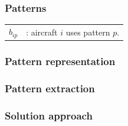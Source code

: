 \section{\thirdtitle}

\begin{frame}
\frametitle{\textbf{Patterns}}
  \begin{tabular}{p{5mm}p{90mm}}
    $b_{ip}$ &: aircraft $i$ uses pattern $p$. \\
  \end{tabular}


\end{frame}

\begin{frame}
\frametitle{\textbf{Pattern representation}}
  \begin{adjustbox}{max totalsize={\textwidth}{\textheight},left, trim=15pt 0 0 0}
    
  \end{adjustbox}

\end{frame}

\begin{frame}
\frametitle{\textbf{Pattern extraction}}

\end{frame}

\begin{frame}
\frametitle{\textbf{Solution approach}}
  \pause
  \begin{adjustbox}{max totalsize={0.8\textwidth}{0.8\textheight},center}
    
  \end{adjustbox}

\end{frame}

